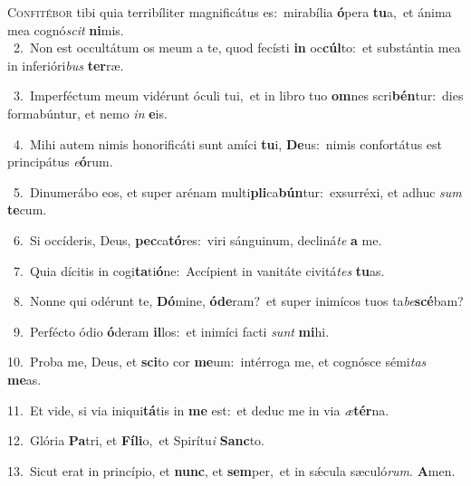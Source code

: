 \lettrine{\initial\textcolor{\initialcolor}{C}}{onfitébor} tibi quia terribíliter magnificátus es:~\dagger mirabília \textbf{ó}\-pera \textbf{tu}\-a,~\star et ánima mea cognó\textit{scit} \textbf{ni}\-mis.\\
{\numbfont\textcolor{\numbcolor}{~2.}}~Non est occultátum os meum a te, quod fecísti \textbf{in} oc\-\textbf{cúl}\-to:~\star et substántia mea in inferióri\textit{bus} \textbf{ter}\-ræ.\par
{\numbfont\textcolor{\numbcolor}{~3.}}~Imperféctum meum vidérunt óculi tui,~\dagger et in libro tuo \textbf{om}\-nes scri\-\textbf{bén}\-tur:~\star dies formabúntur, et nemo \textit{in} \textbf{e}\-is.\par
{\numbfont\textcolor{\numbcolor}{~4.}}~Mihi autem nimis honorificáti sunt amíci \textbf{tu}\-i, \textbf{De}\-us:~\star nimis confortátus est principátus \textit{e}\-\textbf{ó}rum.\par
{\numbfont\textcolor{\numbcolor}{~5.}}~Dinumerábo eos, et super arénam multi\-\textbf{pli}\-ca\-\textbf{bún}\-tur:~\star exsurréxi, et adhuc \textit{sum} \textbf{te}\-cum.\par
{\numbfont\textcolor{\numbcolor}{~6.}}~Si occíderis, Deus, \textbf{pec}\-ca\-\textbf{tó}\-res:~\star viri sánguinum, decliná\textit{te} \textbf{a} me.\par
{\numbfont\textcolor{\numbcolor}{~7.}}~Quia dícitis in cogi\-\textbf{ta}\-ti\-\textbf{ó}\-ne:~\star Accípient in vanitáte civitá\textit{tes} \textbf{tu}\-as.\par
{\numbfont\textcolor{\numbcolor}{~8.}}~Nonne qui odérunt te, \textbf{Dó}\-mine, \textbf{ó}\-\textbf{de}ram?~\star et super inimícos tuos ta\-\textit{be}\-\textbf{scé}bam?\par
{\numbfont\textcolor{\numbcolor}{~9.}}~Perfécto ódio \textbf{ó}\-deram \textbf{il}\-los:~\star et inimíci facti \textit{sunt} \textbf{mi}\-hi.\par
{\numbfont\textcolor{\numbcolor}{10.}}~Proba me, Deus, et \textbf{sci}\-to cor \textbf{me}\-um:~\star intérroga me, et cognósce sémi\textit{tas} \textbf{me}\-as.\par
{\numbfont\textcolor{\numbcolor}{11.}}~Et vide, si via iniqui\-\textbf{tá}\-tis in \textbf{me} est:~\star et deduc me in via \textit{æ}\-\textbf{tér}na.\par
{\numbfont\textcolor{\numbcolor}{12.}}~Glória \textbf{Pa}\-tri, et \textbf{Fí}\-\textbf{li}o,~\star et Spirítu\textit{i} \textbf{Sanc}\-to.\par
{\numbfont\textcolor{\numbcolor}{13.}}~Sicut erat in princípio, et \textbf{nunc}\-, et \textbf{sem}\-per,~\star et in sǽcula sæculó\-\textit{rum}\-. \textbf{A}\-men.\par
